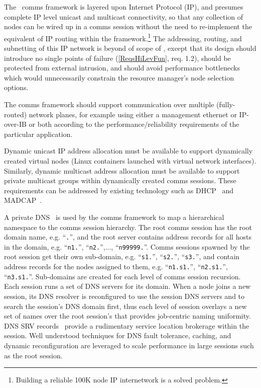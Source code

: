 The \ngrm\ comms framework is layered upon Internet Protocol (IP), and presumes
complete IP level unicast and multicast connectivity, so that any
collection of nodes can be wired up in a comms session without
the need to re-implement the equivalent of IP routing within
the framework.\footnote{Building a reliable 100K node IP internetwork
is a solved problem.} 
The addressing, routing, and subnetting of this IP network is beyond of
scope of \ngrm, except that its design should introduce no single
points of failure (\ref{ReqsHiLevFun}, req. 1.2), should be protected
from external intrusion, and should avoid performance bottlenecks which
would unnecessarily constrain the resource manager's node selection options.

The comms framework should support communication over multiple
(fully-routed) network planes, for example using either a management
ethernet or IP-over-IB or both according to the performance/reliability
requirements of the particular application.

Dynamic unicast IP address allocation must be available to support
dynamically created virtual nodes (Linux containers launched with
virtual network interfaces).  Similarly,
dynamic multicast address allocation must be available to support
private multicast groups within dynamically created comms sessions.
These requirements can be addressed by existing technology such as
DHCP~\cite{rfc2131} and MADCAP~\cite{rfc2730}.

A private DNS~\cite{rfc1034} is used by the comms framework to
map a hierarchical namespace to the comms session hierarchy.
The root comms session has the root domain name, e.g. ``{\tt \ngrm.}'',
and the root server contains address records for all hosts in the domain, e.g.
``{\tt n1.\ngrm}'', ``{\tt n2.\ngrm}'',..., ``{\tt n99999.\ngrm}''.
Comms sessions spawned by the root session get their own sub-domain, e.g.
``{\tt s1.\ngrm}'', ``{\tt s2.\ngrm}'', ``{\tt s3.\ngrm}'',
and contain address records for the nodes assigned to them, e.g.
``{\tt n1.s1.\ngrm}'', ``{\tt n2.s1.\ngrm}'', ``{\tt n3.s1.\ngrm}''.
Sub-domains are created for each level of comms session recursion.
Each session runs a set of DNS servers for its domain.
When a node joins a new session, its DNS resolver is reconfigured to use
the session DNS servers and to search the session's DNS domain first,
thus each level of session overlays a new set of names over
the root session's that provides job-centric naming uniformity.
DNS SRV records~\cite{rfc2782} provide a rudimentary service location
brokerage within the session.
Well understood techniques for DNS fault tolerance,
caching, and dynamic reconfiguration are leveraged to scale performance
in large sessions such as the root session.


